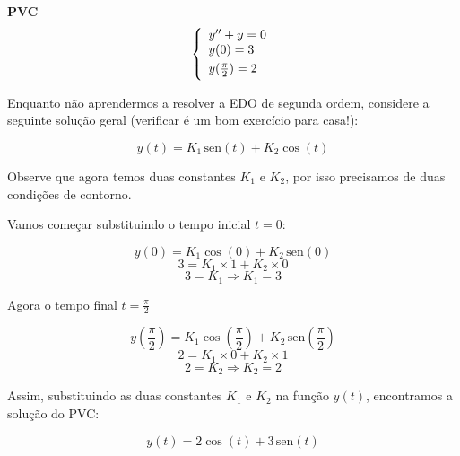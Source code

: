 \documentclass[a4paper]{article}
\providecommand{\sin}{} \renewcommand{\sin}{\hspace{2pt}\mathrm{sen}}
\begin{document}
{\bf PVC}
\begin{displaymath}
  \left\{
    \begin{array}{l}
      y'' + y=0\\
      \smallskip
      y(0)=3\\
      \smallskip
      y(\frac{\pi}{2})=2
    \end{array}
  \right.
\end{displaymath}

Enquanto não aprendermos a resolver a EDO de segunda ordem, considere
a seguinte solução geral (verificar é um bom exercício para casa!):

\begin{displaymath}
  y(t) = K_1\sin(t) + K_2\cos(t)
\end{displaymath}

Observe que agora temos duas constantes $K_1$ e $K_2$, por isso
precisamos de duas condições de contorno.

Vamos começar substituindo o tempo inicial $t=0$:

\begin{displaymath}
  y(0)= K_1\cos(0) + K_2\sin(0)
\end{displaymath}
\begin{displaymath}
  3 = K_1 \times 1 + K_2 \times 0
\end{displaymath}
\begin{displaymath}
  3=K_1 \Rightarrow K_1=3
\end{displaymath}

Agora o tempo final $t=\frac{\pi}{2}$

\begin{displaymath}
  y(\frac{\pi}{2}) = K_1 \cos(\frac{\pi}{2}) + K_2\sin(\frac{\pi}{2})
\end{displaymath}
\begin{displaymath}
  2 = K_1 \times 0 + K_2\times 1
\end{displaymath}
\begin{displaymath}
  2 = K_2 \Rightarrow K_2=2
\end{displaymath}

Assim, substituindo as duas constantes $K_1$ e $K_2$ na função $y(t)$,
encontramos a solução do PVC:

\begin{displaymath}
  y(t) = 2\cos(t) + 3\sin(t)
\end{displaymath}
\end{document}
